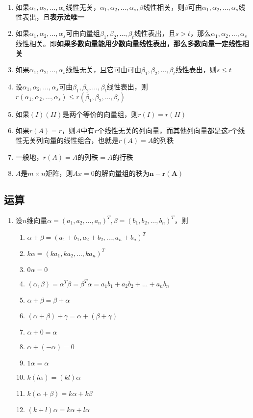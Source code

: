\documentclass[a4paper,12pt]{article}
\begin{document}
\begin{enumerate}
        \item 如果$\alpha_1, \alpha_2, \dots, \alpha_s$线性无关，$\alpha_1, \alpha_2, \dots, \alpha_s, \beta$线性相关，则$\beta$可由$\alpha_1, \alpha_2, \dots, \alpha_s$线性表出，且\textbf{表示法唯一}
        \item 如果$\alpha_1, \alpha_2, \dots, \alpha_s$可由向量组$\beta_1, \beta_2, \dots, \beta_t$线性表出，且$s > t$，那么$\alpha_1, \alpha_2, \dots, \alpha_s$线性相关。即\textbf{如果多数向量能用少数向量线性表出，那么多数向量一定线性相关}
        \item 如果$\alpha_1, \alpha_2, \dots, \alpha_s$线性无关，且它可由可由$\beta_1, \beta_2, \dots, \beta_t$线性表出，则$s \le t$
        \item 设$\alpha_1, \alpha_2, \dots, \alpha_s$可由$\beta_1, \beta_2, \dots, \beta_t$线性表出，则$r(\alpha_1, \alpha_2, \dots, \alpha_s) \le r(\beta_1, \beta_2, \dots, \beta_t)$
        \item 如果$(I)(II)$是两个等价的向量组，则$r(I) = r(II)$
        \item 如果$r(A) = r$，则$A$中有$r$个线性无关的列向量，而其他列向量都是这$r$个线性无关列向量的线性组合，也就是$r(A) = A$的列秩
        \item 一般地，$r(A) = A \text{的列秩} = A \text{的行秩}$
        \item $A$是$m \times n$矩阵，则$Ax = 0$的解向量组的秩为$\mathbf{n - r(A)}$
    \end{enumerate}

    \subsection{运算}

    \begin{enumerate}
        \item 设$n$维向量$\alpha = (a_1, a_2, \dots, a_n)^T, \beta= (b_1, b_2, \dots, b_n)^T$，则
        \begin{enumerate}
            \item $\alpha + \beta = (a_1 + b_1, a_2 + b_2, \dots, a_n + b_n)^T$
            \item $k\alpha = (ka_1, ka_2, \dots, ka_n)^T$
            \item $0\alpha = 0$
            \item $(\alpha, \beta) = \alpha^T\beta = \beta^T\alpha = a_{1}b_{1} + a_{2}b_{2} + \dots + a_{n}b_{n}$
            \item $\alpha + \beta = \beta + \alpha$
            \item $(\alpha + \beta) + \gamma = \alpha + (\beta + \gamma)$
            \item $\alpha + 0 = \alpha $
            \item $\alpha + (-\alpha) = 0$
            \item $1\alpha = \alpha$
            \item $k(l\alpha) = (kl)\alpha$
            \item $k(\alpha + \beta) = k\alpha + k\beta$
            \item $(k + l)\alpha = k\alpha + l\alpha$
        \end{enumerate}
    \end{enumerate}
\end{document}

